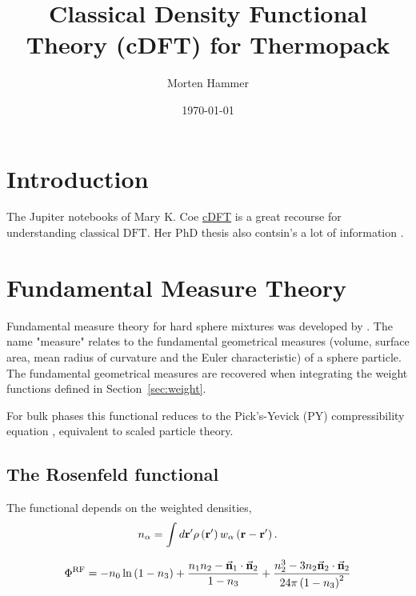 \documentclass[12pt, letterpaper]{article}
\title{Classical Density Functional Theory (cDFT) for Thermopack}
\author{Morten Hammer}
\date{\today}
\newcommand*{\vc}[1]{\vec{\mathbf{#1}}}%
\newcommand*{\lb}{\ensuremath{\left(}}
\newcommand*{\rb}{\ensuremath{\right)}}
\newcommand{\cdft}{\ensuremath{\text{classical DFT}}\xspace}
\newcommand{\RF}{\ensuremath{\text{RF}}\xspace}
\begin{document}


\begin{titlepage}
\maketitle
\end{titlepage}

\section{Introduction}

The Jupiter notebooks of Mary K. Coe
\href{https://github.com/marykcoe/cDFT_Package}{cDFT} is a great recourse for
understanding \cdft. Her PhD thesis also contsin's a lot of information
\cite{coe2021}.

\section{Fundamental Measure Theory}
Fundamental measure theory for hard sphere mixtures was developed by
\citet{rosenfeld1989}. The name "measure" relates to the fundamental
geometrical measures (volume, surface area, mean radius of curvature
and the Euler characteristic) of a sphere particle. The fundamental
geometrical measures are recovered when integrating the weight
functions defined in Section~\ref{sec:weight}.

For bulk phases this functional reduces to the Pick's-Yevick (PY)
compressibility equation \cite{percus1958}, equivalent to scaled
particle theory.

\subsection{The Rosenfeld functional}

The functional depends on the weighted densities,
\begin{equation}
  n_\alpha = \int d \mathbf{r}^\prime \rho \lb \mathbf{r}^\prime \rb w_\alpha \lb \mathbf{r} - \mathbf{r}^\prime \rb.
\end{equation}

\begin{equation}
  \Phi^\RF = -n_0 \ln \lb 1 - n_3 \rb +
  \frac{n_1 n_2 - \vc{n}_1 \cdot \vc{n}_2}{1 - n_3} +
  \frac{n_2^3 - 3 n_2 \vc{n}_2 \cdot \vc{n}_2}{24\pi \lb 1 - n_3 \rb^2}
\end{equation}
\end{document}
